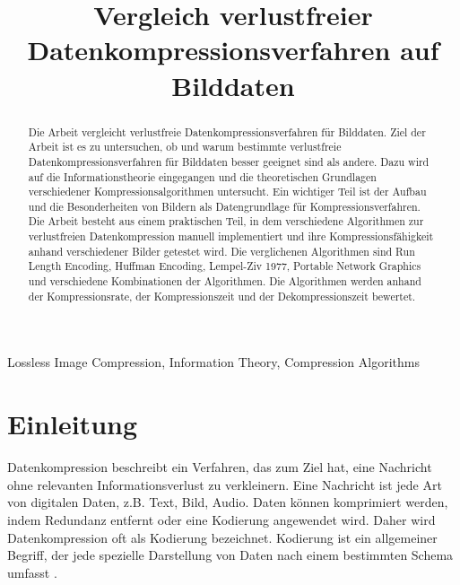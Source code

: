 \documentclass[conference]{IEEEtran}
\begin{document}
\title{Vergleich verlustfreier Datenkompressionsverfahren auf Bilddaten}

\author{
}

\maketitle

\begin{abstract}

  Die Arbeit vergleicht verlustfreie Datenkompressionsverfahren für Bilddaten.
  Ziel der Arbeit ist es zu untersuchen, ob und warum bestimmte verlustfreie 
  Datenkompressionsverfahren für Bilddaten besser geeignet sind als andere.
  Dazu wird auf die Informationstheorie eingegangen und die theoretischen 
  Grundlagen verschiedener Kompressionsalgorithmen untersucht.
  Ein wichtiger Teil ist der Aufbau und die Besonderheiten von Bildern als 
  Datengrundlage für Kompressionsverfahren.
  Die Arbeit besteht aus einem praktischen Teil, in dem verschiedene Algorithmen 
  zur verlustfreien Datenkompression manuell implementiert und ihre Kompressionsfähigkeit 
  anhand verschiedener Bilder getestet wird.
  Die verglichenen Algorithmen sind Run Length Encoding, Huffman Encoding,
  Lempel-Ziv 1977, Portable Network Graphics und verschiedene Kombinationen der Algorithmen.
  Die Algorithmen werden anhand der Kompressionsrate, der Kompressionszeit und der 
  Dekompressionszeit bewertet.

\end{abstract}


\begin{IEEEkeywords}
  Lossless Image Compression, Information Theory, Compression Algorithms
\end{IEEEkeywords}

\section{Einleitung}

Datenkompression beschreibt ein Verfahren, das zum Ziel hat, eine Nachricht
ohne relevanten Informationsverlust zu verkleinern.
Eine Nachricht ist jede Art von digitalen Daten, z.B. Text, Bild, Audio.
Daten können komprimiert werden, indem Redundanz entfernt oder eine Kodierung angewendet wird.
Daher wird Datenkompression oft als Kodierung bezeichnet.
Kodierung ist ein allgemeiner Begriff, der jede spezielle Darstellung von Daten nach
einem bestimmten Schema umfasst \cite{Ingles}. 
\end{document}
